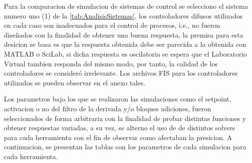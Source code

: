         Para la comparacion de simulacion de sistemas de control se selecciono el sistema numero uno (1) de la \cref{tab:AnalisisSistemas}, los controladores difusos utilizados en cada caso son inadecuados para el control de procesos, i.e., no fueron diseñados con la finalidad de obtener una buena respuesta, la premisa para esta desicion se basa es que la respuesta obtenida debe ser parecida a la obtenida con MATLAB o SciLab, si dicha respuesta es oscilatoria se espera que el Laboratorio Virtual tambien responda del mismo modo, por tanto, la calidad de los controladores se consideró irrelevante. Los archivos FIS para los controladores utilizados se pueden observar en el anexo tales.

        Los parametros bajo los que se realizaron las simulaciones como el setpoint, activacion o no del filtro de la derivada y/o bloques adiciones, fueron seleccionados de forma arbitraria con la finalidad de probar distintas funciones y obtener respuestas variadas, a su vez, se alterno el uso de de distintos solvers para cada herramienta con el fin de observar como afectaban la presicion. A continuacion, se presentan las tablas con los parametros de cada simulacion para cada herramienta.

